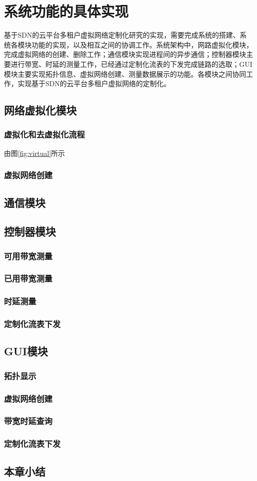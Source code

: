 \chapter{系统功能的具体实现}
基于SDN的云平台多租户虚拟网络定制化研究的实现，需要完成系统的搭建、系统各模块功能的实现，以及相互之间的协调工作。系统架构中，网路虚拟化模块，完成虚拟网络的创建、删除工作；通信模块实现进程间的异步通信；控制器模块主要进行带宽、时延的测量工作，已经通过定制化流表的下发完成链路的选取；GUI模块主要实现拓扑信息、虚拟网络创建、测量数据展示的功能。各模块之间协同工作，实现基于SDN的云平台多租户虚拟网络的定制化。
\section{网络虚拟化模块}
\subsection{虚拟化和去虚拟化流程}
由图\ref{fig:virtual}所示
\subsection{虚拟网络创建}
\section{通信模块}
\section{控制器模块}
\subsection{可用带宽测量}
\subsection{已用带宽测量}
\subsection{时延测量}
\subsection{定制化流表下发}
\section{GUI模块}
\subsection{拓扑显示}
\subsection{虚拟网络创建}
\subsection{带宽时延查询}
\subsection{定制化流表下发}
\section{本章小结}